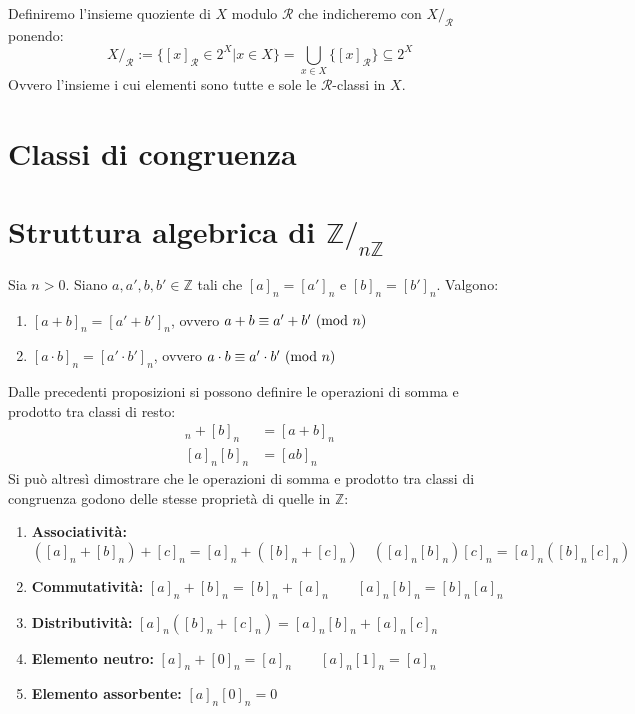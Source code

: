 \begin{tcolorbox}[colback=yellow!30, colframe=yellow!30!black, title=Insieme Quoziente]
Definiremo l'insieme quoziente di $X$ modulo $\mathcal{R}$ che indicheremo
con $X/_\mathcal{R}$ ponendo:
\[ X/_{\mathcal{R}}:= \{[x]_\mathcal{R} \in 2^X | x \in X \} = \bigcup_{x \in X} \{[x]_\mathcal{R}\} \subseteq 2^X \]
Ovvero l'insieme i cui elementi sono tutte e sole le $\mathcal{R}$-classi in $X$.
\end{tcolorbox}

\section{Classi di congruenza}

\section{Struttura algebrica di $\mathbb{Z}/_{n\mathbb{Z}}$}
Sia $n>0$. Siano $a,a',b,b' \in \mathbb{Z}$ tali che
$[a]_n = [a']_n \text{ e } [b]_n = [b']_n $.
Valgono:
\begin{enumerate}
\item $[a+b]_n = [a'+b']_n$, ovvero $a+b \equiv a'+b' \ (\mathrm{mod}\ n)$
\item $[a \cdot b]_n = [a' \cdot b']_n$, ovvero $a \cdot b \equiv a' \cdot b' \ (\mathrm{mod}\ n)$
\end{enumerate}
Dalle precedenti proposizioni si possono definire le operazioni di
somma e prodotto tra classi di resto:
\begin{align*}
[a]_n+[b]_n &= [a+b]_n\\
[a]_n[b]_n &= [ab]_n
\end{align*}
Si può altresì dimostrare che le operazioni
di somma e prodotto tra classi di congruenza godono delle
stesse proprietà di quelle in $\mathbb{Z}$:
\begin{enumerate}
\item \textbf{Associatività:}\\$([a]_n + [b]_n) + [c]_n = [a]_n + ([b]_n + [c]_n) \quad ([a]_n[b]_n)[c]_n = [a]_n([b]_n[c]_n)$
\item \textbf{Commutatività:} $[a]_n + [b]_n = [b]_n + [a]_n \qquad [a]_n[b]_n = [b]_n[a]_n$
\item \textbf{Distributività:} $[a]_n([b]_n+[c]_n) = [a]_n[b]_n + [a]_n[c]_n$
\item \textbf{Elemento neutro:} $[a]_n + [0]_n = [a]_n \qquad [a]_n[1]_n = [a]_n$
\item \textbf{Elemento assorbente:} $[a]_n[0]_n = 0$
\end{enumerate}
